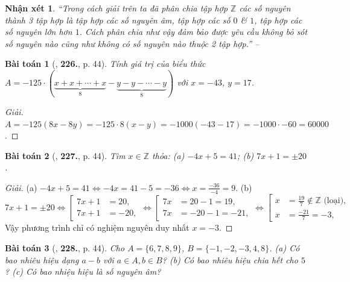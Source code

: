 \documentclass{article}
\numberwithin{equation}{section}
\newtheorem{baitoan}{Bài toán}
\newtheorem{nhanxet}{Nhận xét}[section]
\begin{document}
\begin{nhanxet}
	``Trong cách giải trên ta đã phân chia tập hợp $\mathbb{Z}$ các số nguyên thành 3 tập hợp là tập hợp các số nguyên âm, tập hợp các số $0$ \& $1$, tập hợp các số nguyên lớn hơn $1$. Cách phân chia như vậy đảm bảo được yêu cầu không bỏ sót số nguyên nào cũng như không có số nguyên nào thuộc 2 tập hợp.'' -- \cite[p. 44]{Tuyen_Toan_6}
\end{nhanxet}

\begin{baitoan}[\cite{Tuyen_Toan_6}, \textbf{226.}, p. 44]
	Tính giá trị của biểu thức $A = -125\cdot(\underbrace{x + x + \cdots + x}_8 - \underbrace{y - y - \cdots - y}_8)$ với $x = -43$, $y = 17$.
\end{baitoan}

\begin{proof}[Giải]
	$A = -125(8x - 8y) = -125\cdot8(x - y) = -1000(-43 - 17) = -1000\cdot-60 = 60000$.
\end{proof}

\begin{baitoan}[\cite{Tuyen_Toan_6}, \textbf{227.}, p. 44]
	Tìm $x\in\mathbb{Z}$ thỏa: (a) $-4x + 5 = 41$; (b) $7x + 1 = \pm20$.
\end{baitoan}

\begin{proof}[Giải]
	(a) $-4x + 5 = 41\Leftrightarrow -4x = 41 - 5 = -36\Leftrightarrow x = \frac{-36}{-4} = 9$. (b)
	\begin{equation*}
		7x + 1 = \pm20\Leftrightarrow\left[\begin{split}
			7x + 1 &= 20,\\
			7x + 1 &= -20,
		\end{split}\right.\Leftrightarrow\left[\begin{split}
		7x &= 20 - 1 = 19,\\
		7x &= -20 - 1 = -21,
	\end{split}\right.\Leftrightarrow\left[\begin{split}
		x &= \frac{19}{7}\notin\mathbb{Z}\mbox{ (loại)},\\
		x &= \frac{-21}{7} = -3,
	\end{split}\right.
	\end{equation*}
	Vậy phương trình chỉ có nghiệm nguyên duy nhất $x = -3$.
\end{proof}

\begin{baitoan}[\cite{Tuyen_Toan_6}, \textbf{228.}, p. 44]
	Cho $A = \{6,7,8,9\}$, $B = \{-1,-2,-3,4,8\}$. (a) Có bao nhiêu hiệu dạng $a - b$ với $a\in A,b\in B$? (b) Có bao nhiêu hiệu chia hết cho $5$? (c) Có bao nhiệu hiệu là số nguyên âm?
\end{baitoan}
\end{document}
